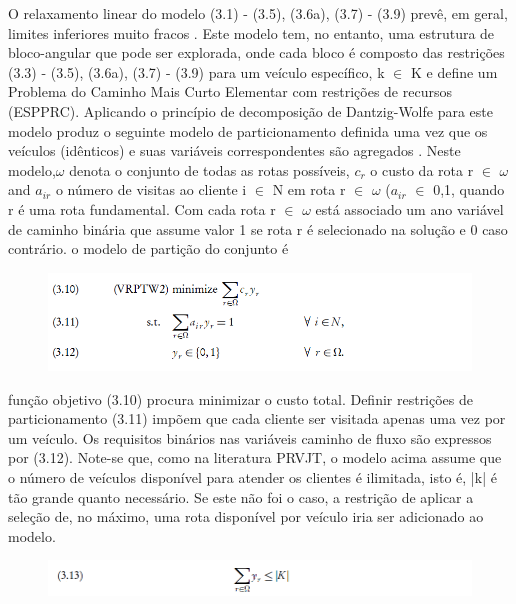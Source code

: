 O relaxamento linear do modelo (3.1) - (3.5), (3.6a), (3.7) - (3.9) prevê, em geral, limites inferiores muito fracos . Este modelo tem, no entanto, uma estrutura de bloco-angular que pode ser explorada, onde cada bloco é composto das restrições (3.3) - (3.5), (3.6a), (3.7) - (3.9) para um veículo específico, k $\in$ K e define um Problema do Caminho Mais Curto Elementar com restrições de recursos (ESPPRC). Aplicando o princípio de decomposição de Dantzig-Wolfe \cite{gendreau01} para este modelo produz o seguinte modelo de particionamento definida uma vez que os veículos (idênticos) e suas variáveis correspondentes são agregados \cite{gendreau10}. Neste modelo,$\omega$ denota o conjunto de todas as rotas possíveis, $c_r$ o custo da rota r $\in$ $\omega$ and $a_{ir}$ o número de visitas ao cliente i $\in$ N em rota r $\in$ $\omega$ ($a_{ir}$ $\in$ {0,1}, quando r é uma rota fundamental. Com cada rota r $\in$ $\omega$ está associado um ano variável de caminho binária que assume valor 1 se rota r é selecionado na solução e 0 caso contrário. o modelo de partição do conjunto é

\begin{figure}[ht!]
\centering
\includegraphics[scale=0.7]{figuras/math2.PNG}
\label{math2}
\end{figure}



função objetivo (3.10) procura minimizar o custo total. Definir restrições de particionamento (3.11) impõem que cada cliente ser visitada apenas uma vez por um veículo. Os requisitos binários nas variáveis caminho de fluxo são expressos por (3.12). Note-se que, como na literatura PRVJT, o modelo acima assume que o número de veículos disponível para atender os clientes é ilimitada, isto é, |k| é tão grande quanto necessário. Se este não foi o caso, a restrição de aplicar a seleção de, no máximo, uma rota disponível por veículo iria ser adicionado ao modelo.

\begin{figure}[ht!]
\centering
\includegraphics[scale=0.7]{figuras/math3.PNG}
\label{math3}
\end{figure}
 
